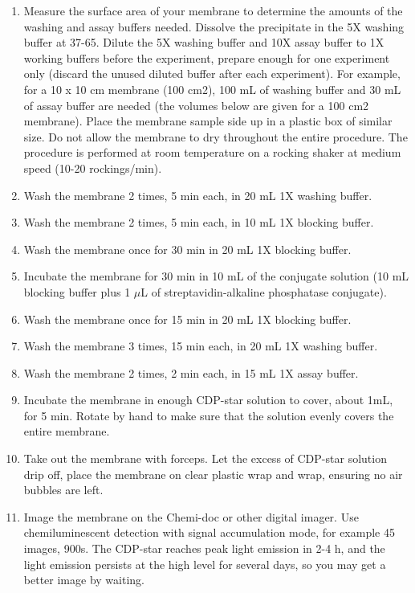 \documentclass{article}
\newcommand{\mul}{\ensuremath{\mu}L\xspace}
\newcommand{\degC}{\celsius\xspace}
\begin{document}
\begin{enumerate}[resume]
  \item Measure the surface area of your membrane to determine the amounts of the washing and assay buffers needed. Dissolve the precipitate in the 5X washing buffer at 37-65\degC. Dilute the 5X washing buffer and 10X assay buffer to 1X working buffers before the experiment, prepare enough for one experiment only (discard the unused diluted buffer after each experiment). For example, for a 10 x 10 cm membrane (100 cm2), 100 mL of washing buffer and 30 mL of assay buffer are needed (the volumes below are given for a 100 cm2 membrane). Place the membrane sample side up in a plastic box of similar size. Do not allow the membrane to dry throughout the entire procedure. The procedure is performed at room temperature on a rocking shaker at medium speed (10-20 rockings/min).
\item Wash the membrane 2 times, 5 min each, in 20 mL 1X washing buffer. 
\item Wash the membrane 2 times, 5 min each, in 10 mL 1X blocking buffer.
\item Wash the membrane once for 30 min in 20 mL 1X blocking buffer. 
\item Incubate the membrane for 30 min in 10 mL of the conjugate solution (10 mL
blocking buffer plus 1 \mul of streptavidin-alkaline phosphatase conjugate).   
\item Wash the membrane once for 15 min in 20 mL 1X blocking buffer. 
\item Wash the membrane 3 times, 15 min each, in 20 mL 1X washing buffer. 
\item Wash the membrane 2 times, 2 min each, in 15 mL 1X assay buffer. 
\item Incubate the membrane in enough CDP-star solution to cover, about 1mL, for 5 min. Rotate by hand to make sure that the solution evenly covers the entire membrane. 
\item Take out the membrane with forceps. Let the excess of CDP-star solution drip off, place the membrane on clear plastic wrap and wrap, ensuring no air bubbles are left.
\item Image the membrane on the Chemi-doc or other digital imager. Use chemiluminescent detection with signal accumulation mode, for example 45 images, 900s.
The CDP-star reaches peak light emission in 2-4 h, and the light emission persists at the high level for several days, so you may get a better image by waiting.
\end{enumerate}
\end{document}

